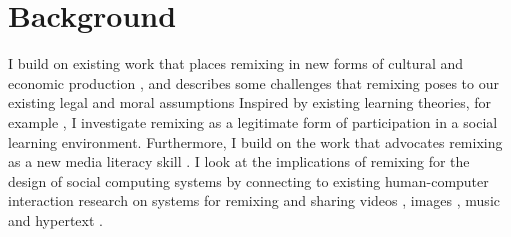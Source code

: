 \chapter{Background}

I build on existing work that places remixing in new forms of cultural and economic production \citep{benkler_wealth_2006,jenkins_convergence_2006,manovich_remix_2005,sinnreich_ethics_2009}, and describes some challenges that remixing poses to our existing legal and moral assumptions \citep{lessig_remix:_2008, posner_little_2007}
Inspired by existing learning theories, for example \citet{lave_situated_1991}, I investigate remixing as a legitimate form of participation in a social learning environment.
Furthermore,  I build on the work that advocates remixing as a new media literacy skill \citep{ito_hanging_2010, jenkins_confronting_2009, livingstone_taking_2008, perkel_copy_2008}.
I look at the implications of remixing for the design of social computing systems by connecting to existing human-computer interaction research on systems for remixing and sharing videos \citep{diakopoulos_evolution_2007}, images \citep{seneviratne_policy-aware_2009}, music \citep{cheliotis_analysis_2009} and hypertext \citep{viegas_studying_2004}.


